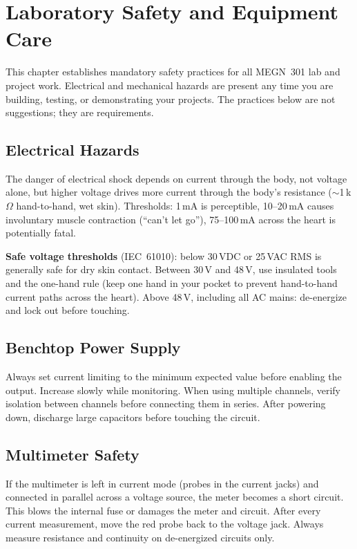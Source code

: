\chapter*{Laboratory Safety and Equipment Care}

This chapter establishes mandatory safety practices for all MEGN~301 lab and project work. Electrical and mechanical hazards are present any time you are building, testing, or demonstrating your projects. The practices below are not suggestions; they are requirements.

\section*{Electrical Hazards}
The danger of electrical shock depends on current through the body, not voltage alone, but higher voltage drives more current through the body's resistance ($\sim$1\,k$\Omega$ hand-to-hand, wet skin). Thresholds: 1\,mA is perceptible, 10--20\,mA causes involuntary muscle contraction (``can't let go''), 75--100\,mA across the heart is potentially fatal.

\textbf{Safe voltage thresholds} (IEC~61010): below 30\,VDC or 25\,VAC RMS is generally safe for dry skin contact. Between 30\,V and 48\,V, use insulated tools and the one-hand rule (keep one hand in your pocket to prevent hand-to-hand current paths across the heart). Above 48\,V, including all AC mains: de-energize and lock out before touching.

\section*{Benchtop Power Supply}
Always set current limiting to the minimum expected value before enabling the output. Increase slowly while monitoring. When using multiple channels, verify isolation between channels before connecting them in series. After powering down, discharge large capacitors before touching the circuit.

\section*{Multimeter Safety}
\begin{warningbox}
If the multimeter is left in current mode (probes in the current jacks) and connected in parallel across a voltage source, the meter becomes a short circuit. This blows the internal fuse or damages the meter and circuit. After every current measurement, move the red probe back to the voltage jack. Always measure resistance and continuity on de-energized circuits only.
\end{warningbox}

